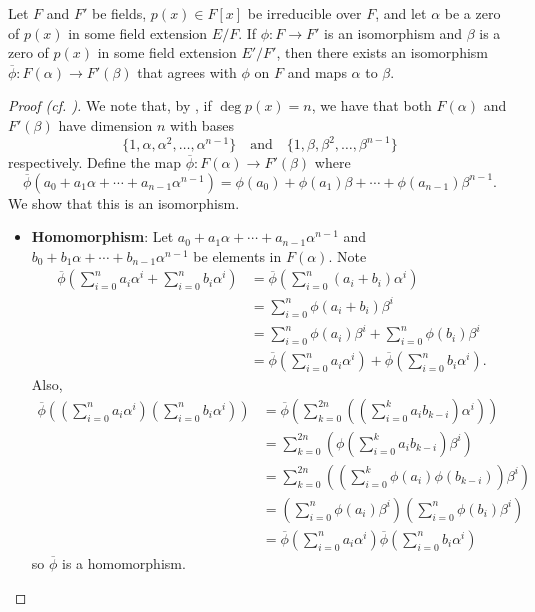 \begin{lemma}\label{lemma-isomorphism-extension}
    Let $F$ and $F'$ be fields, $p(x) \in F[x]$ be irreducible over $F$, and let $\alpha$ be a zero of $p(x)$ in some field extension $E/F$. If $\phi: F \to F'$ is an isomorphism and $\beta$ is a zero of $p(x)$ in some field extension $E'/F'$, then there exists an isomorphism $\overline{\phi}: F(\alpha) \to F'(\beta)$ that agrees with $\phi$ on $F$ and maps $\alpha$ to $\beta$.
\end{lemma}
\begin{proof}[Proof (cf. {\cite[Lemma 21.32]{judson_beezer_2022}})]
    We note that, by , if $\deg p(x) = n$, we have that both $F(\alpha)$ and $F'(\beta)$ have dimension $n$ with bases
    \[
        \{1, \alpha, \alpha^2, \dots, \alpha^{n-1}\} \quad\text{and}\quad\{1, \beta, \beta^2, \dots, \beta^{n-1}\}
    \]
    respectively. Define the map $\overline{\phi}: F(\alpha) \to F'(\beta)$ where
    \[
        \overline{\phi}\left(a_0 + a_1\alpha + \cdots + a_{n-1}\alpha^{n-1}\right) = \phi(a_0) + \phi(a_1)\beta + \cdots + \phi(a_{n-1})\beta^{n-1}.
    \]
    We show that this is an isomorphism.
    \begin{itemize}
        \item \textbf{Homomorphism}: Let $a_0 + a_1\alpha + \cdots + a_{n-1}\alpha^{n-1}$ and $b_0 + b_1\alpha + \cdots + b_{n-1}\alpha^{n-1}$ be elements in $F(\alpha)$. Note
        \begin{align*}
            \overline{\phi}\left(\sum_{i=0}^na_i\alpha^i + \sum_{i=0}^nb_i\alpha^i\right) &=\overline{\phi}\left(\sum_{i=0}^n(a_i+b_i)\alpha^i\right)\\
            &=\sum_{i=0}^n\phi(a_i+b_i)\beta^i\\
            &= \sum_{i=0}^n\phi(a_i)\beta^i + \sum_{i=0}^n\phi(b_i)\beta^i\\
            &= \overline{\phi}\left(\sum_{i=0}^na_i\alpha^i\right) + \overline{\phi}\left(\sum_{i=0}^nb_i\alpha^i\right).
        \end{align*}
        Also,
        \begin{align*}
            \overline{\phi}\left(\left(\sum_{i=0}^na_i\alpha^i\right)\left(\sum_{i=0}^nb_i\alpha^i\right)\right) &= \overline{\phi}\left(\sum_{k=0}^{2n}\left(\left(\sum_{i=0}^ka_ib_{k-i}\right)\alpha^i\right)\right)\\
            &= \sum_{k=0}^{2n}\left(\phi\left(\sum_{i=0}^ka_ib_{k-i}\right)\beta^i\right)\\
            &= \sum_{k=0}^{2n}\left(\left(\sum_{i=0}^k\phi(a_i)\phi(b_{k-i})\right)\beta^i\right)\\
            &=\left(\sum_{i=0}^n\phi(a_i)\beta^i\right)\left(\sum_{i=0}^n\phi(b_i)\beta^i\right)\\
            &= \overline{\phi}\left(\sum_{i=0}^na_i\alpha^i\right)\overline{\phi}\left(\sum_{i=0}^nb_i\alpha^i\right)
        \end{align*}
        so $\overline{\phi}$ is a homomorphism.


\end{itemize}
\end{proof}

